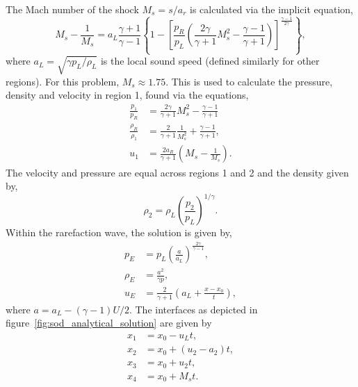 The Mach number of the shock $M_s = s/a_r$ is calculated via the implicit equation,
\begin{equation}
  \label{eq:mach_shock}
M_s - \frac{1}{M_s} = a_L \frac{\gamma + 1}{\gamma - 1} \left\{
1 - \left[
\frac{p_R}{p_L} \left(
\frac{2\gamma}{\gamma +1}M_s^2 - \frac{\gamma - 1}{\gamma +1} 
\right)
\right]^{\frac{\gamma - 1}{2\gamma}}
\right\},
\end{equation}
where $a_L = \sqrt{\gamma p_L / \rho_L}$ is the local sound speed (defined similarly for other regions). For this problem, $M_s \approx 1.75$. This is used to calculate the pressure, density and velocity in region 1, found via the equations,
\begin{equation}
  \label{eq:sod_region1}
\begin{aligned}
\frac{p_1}{p_R} &= \frac{2\gamma}{\gamma + 1} M_s^2 - \frac{\gamma -1}{\gamma +1}\\
\frac{\rho_R}{\rho_1} &= \frac{2}{\gamma + 1} \frac{1}{M_s^2} + \frac{\gamma -1}{\gamma + 1},\\
u_1 &= \frac{2a_R}{\gamma + 1} \left( M_s - \frac{1}{M_s} \right).
\end{aligned}
\end{equation}
The velocity and pressure are equal across regions 1 and 2 and the density given by,
\begin{equation}
  \label{eq:sod_region2}
\rho_2 = \rho_L \left( \frac{p_2}{p_L} \right)^{1/\gamma}.
\end{equation}
Within the rarefaction wave, the solution is given by,
\begin{equation}
  \label{eq:sod_regionE}
  \begin{aligned}
  p_E &= p_L \left( \frac{a}{a_L} \right)^{\frac{2\gamma}{\gamma-1}},\\
  \rho_E &= \frac{a^2}{\gamma p},\\
  u_E &= \frac{2}{\gamma +1} \left(a_L + \frac{x - x_0}{t}\right),
  \end{aligned}
\end{equation}
where $a = a_L - (\gamma-1)U/2$. The interfaces as depicted in figure~\ref{fig:sod_analytical_solution} are given by
\begin{equation}
  \label{eq:sod_interfaces}
\begin{aligned}
x_1 &= x_0 - u_L t,\\
x_2 &= x_0 + (u_2 - a_2)t, \\
x_3 &= x_0 + u_2 t, \\
x_4 &= x_0 + M_s t.
\end{aligned}
\end{equation}


